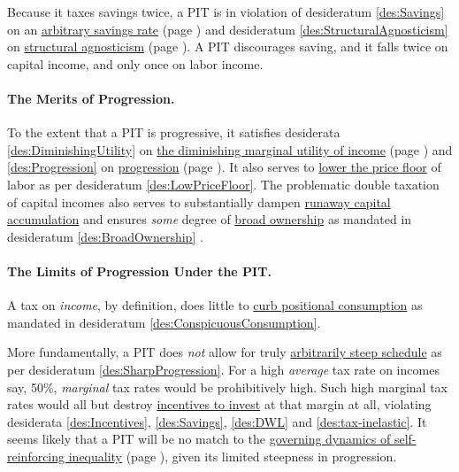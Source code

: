 Because it taxes savings twice, a PIT is in violation of desideratum \ref{des:Savings} on an \hyperref[des:Savings]{arbitrary savings rate} (page \pageref{des:Savings}) and desideratum \ref{des:StructuralAgnosticism} on \hyperref[des:StructuralAgnosticism]{structural agnosticism} (page \pageref{des:StructuralAgnosticism}).
A PIT discourages saving, and it falls twice on capital income, and only once on labor income.

\paragraph{The Merits of Progression.}
To the extent that a PIT is progressive, it satisfies desiderata \ref{des:DiminishingUtility} on \hyperref[des:DiminishingUtility]{the diminishing marginal utility of income} (page \pageref{des:DiminishingUtility}) and \ref{des:Progression} on \hyperref[des:Progression]{progression} (page \pageref{des:Progression}).
It also serves to \hyperref[des:LowPriceFloor]{lower the price floor} of labor as per desideratum \ref{des:LowPriceFloor}.
The problematic double taxation of capital incomes also serves to substantially dampen \hyperref[sec:GovDynofIneq]{runaway capital accumulation} and ensures \emph{some} degree of \hyperref[des:BroadOwnership]{broad ownership} as mandated in desideratum \ref{des:BroadOwnership} \citep[810]{McCaffery2005}.

\paragraph{The Limits of Progression Under the PIT.}
A tax on \emph{income}, by definition, does little to \hyperref[des:ConspicuousConsumption]{curb positional consumption} as mandated in desideratum \ref{des:ConspicuousConsumption}.

More fundamentally, a PIT does \emph{not} allow for truly \hyperref[des:SharpProgression]{arbitrarily steep schedule} as per desideratum \ref{des:SharpProgression}.
For a high \emph{average} tax rate on incomes say, 50\%, \emph{marginal} tax rates would be prohibitively high.
Such high marginal tax rates would all but destroy \hyperref[des:Incentives]{incentives to invest} at that margin at all, violating desiderata \ref{des:Incentives}, \ref{des:Savings}, \ref{des:DWL} and \ref{des:tax-inelastic}.
It seems likely that a PIT will be no match to the \hyperref[sec:GovDynofIneq]{governing dynamics of self-reinforcing inequality} (page \pageref{sec:GovDynofIneq}), given its limited steepness in progression.

